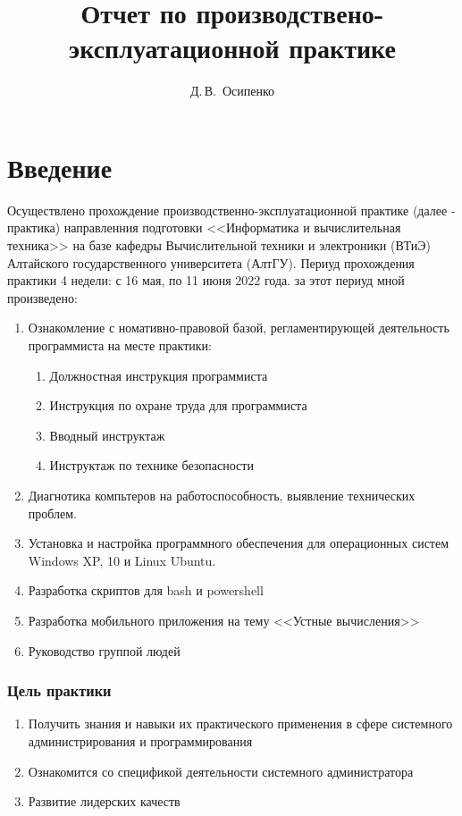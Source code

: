 \documentclass[14pt, oneside]{altsu-report}
\title{Отчет по производствено-эксплуатационной практике}
\author{Д.\,В.~Осипенко}
\institute{Институт цифровых технологий, электроники и физики}
\date{\the\year}
\begin{document}
\maketitle

\setcounter{page}{2}
\tableofcontents

\chapter*{Введение}
Осуществлено прохождение производственно-эксплуатационной практике (далее - практика) направленния подготовки <<Информатика и вычислительная техника>> на базе кафедры Вычислительной техники и электроники (ВТиЭ) Алтайского государственного университета (АлтГУ).  
Периуд прохождения практики 4 недели: с 16 мая, по 11 июня 2022 года. за этот периуд мной произведено:
\begin{enumerate}
  \item Ознакомление с номативно-правовой базой, регламентирующей деятельность программиста на месте практики:
  \begin{enumerate}
    \item Должностная инструкция программиста
    \item Инструкция по охране труда для программиста
    \item Вводный инструктаж
    \item Инструктаж по технике безопасности
  \end{enumerate}
  \item Диагнотика компьтеров на работоспособность, выявление технических проблем.
  \item Установка и настройка программного обеспечения для операционных систем Windows XP, 10 и Linux Ubuntu.
  \item Разработка скриптов для bash и powershell
  \item Разработка мобильного приложения на тему <<Устные вычисления>>
  \item Руководство группой людей
\end{enumerate} 

\subsection*{Цель практики}
\begin{enumerate}
  \item Получить знания и навыки их практического применения в сфере системного администрирования и программирования
  \item Ознакомится со спецификой деятельности системного администратора
  \item Развитие лидерских качеств
\end{enumerate}
\end{document}
